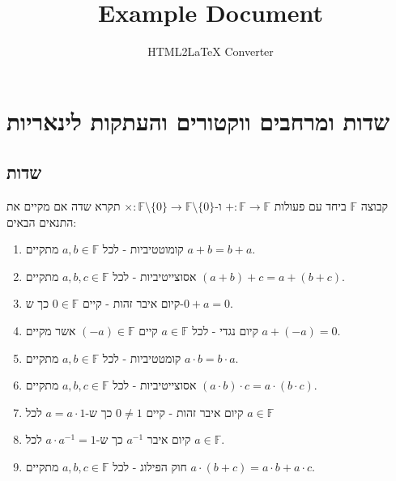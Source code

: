 \documentclass{tstextbook}
\begin{document}
\title{Example Document}
\author{HTML2LaTeX Converter}
\maketitle

\section{שדות ומרחבים ווקטורים והעתקות לינאריות}

\subsection{שדות}

\begin{definition}[שדה]
קבוצה \(\mathbb{F}\) ביחד עם פעולות \(+:\mathbb{F} \to \mathbb{F}\) ו-\(\times:\mathbb{F} \setminus \{ 0 \}\to \mathbb{F} \setminus \{ 0 \}\) תקרא שדה אם מקיים את התנאים הבאים:

  \begin{enumerate}
    \item קומוטטיביות - לכל \(a,b \in \mathbb{F}\) מתקיים \(a+b=b+a\). 


    \item אסוצייטיביות - לכל \(a,b,c \in \mathbb{F}\) מתקיים \((a+b)+c=a+(b+c)\). 


    \item קיום איבר זהות - קיים \(0 \in \mathbb{F}\) כך ש-\(0+a=0\). 


    \item קיום נגדי - לכל \(a \in \mathbb{F}\) קיים \((-a) \in \mathbb{F}\) אשר מקיים \(a+(-a)=0\). 


    \item קומטטיביות - לכל \(a,b \in \mathbb{F}\) מתקיים \(a\cdot b=b\cdot a\). 


    \item אסוצייטיביות - לכל \(a,b,c \in \mathbb{F}\) מתקיים \(\left( a\cdot b \right)\cdot c=a\cdot\left( b\cdot c \right)\). 


    \item קיום איבר זהות - קיים \(0\neq 1\) כך ש-\(a=a\cdot 1\) לכל \(a \in \mathbb{F}\)


    \item קיום איבר \(a^{-1}\) כך ש-\(a\cdot a ^{-1}= 1\) לכל \(a \in \mathbb{F}\). 


    \item חוק הפילוג - לכל \(a,b,c \in \mathbb{F}\) מתקיים \(a\cdot(b+c)=a\cdot b+a\cdot c\). 


  \end{enumerate}
\end{definition}
\end{document}
